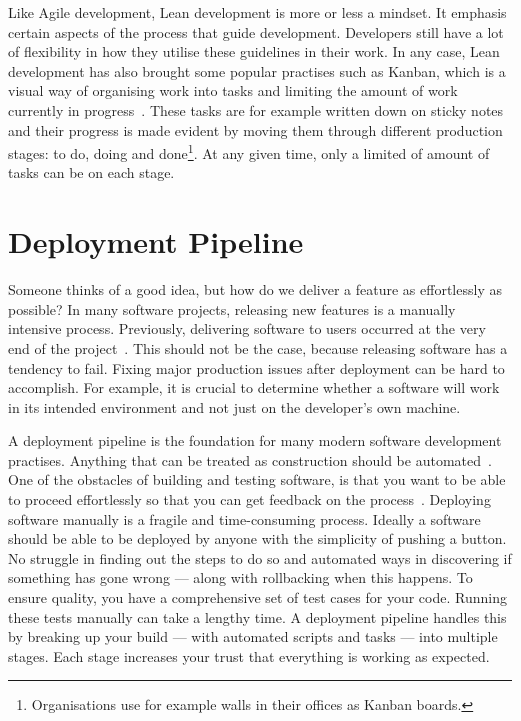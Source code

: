 \documentclass[english]{tktltiki2}
\begin{document}
Like Agile development, Lean development is more or less a mindset. It emphasis certain aspects of the process that guide development. Developers still have a lot of flexibility in how they utilise these guidelines in their work. In any case, Lean development has also brought some popular practises such as Kanban, which is a visual way of organising work into tasks and limiting the amount of work currently in progress~\cite{Mon12}. These tasks are for example written down on sticky notes and their progress is made evident by moving them through different production stages: to do, doing and done\footnote{Organisations use for example walls in their offices as Kanban boards.}. At any given time, only a limited of amount of tasks can be on each stage.


\section{Deployment Pipeline}

Someone thinks of a good idea, but how do we deliver a feature as effortlessly as possible? In many software projects, releasing new features is a manually intensive process. Previously, delivering software to users occurred at the very end of the project~\cite{HAB12}. This should not be the case, because releasing software has a tendency to fail. Fixing major production issues after deployment can be hard to accomplish. For example, it is crucial to determine whether a software will work in its intended environment and not just on the developer’s own machine.

A deployment pipeline is the foundation for many modern software development practises. Anything that can be treated as construction should be automated~\cite{Fow05}. One of the obstacles of building and testing software, is that you want to be able to proceed effortlessly so that you can get feedback on the process~\cite{Fow13b}. Deploying software manually is a fragile and time-consuming process. Ideally a software should be able to be deployed by anyone with the simplicity of pushing a button. No struggle in finding out the steps to do so and automated ways in discovering if something has gone wrong — along with rollbacking when this happens. To ensure quality, you have a comprehensive set of test cases for your code. Running these tests manually can take a lengthy time. A deployment pipeline handles this by breaking up your build — with automated scripts and tasks — into multiple stages. Each stage increases your trust that everything is working as expected.
\end{document}

